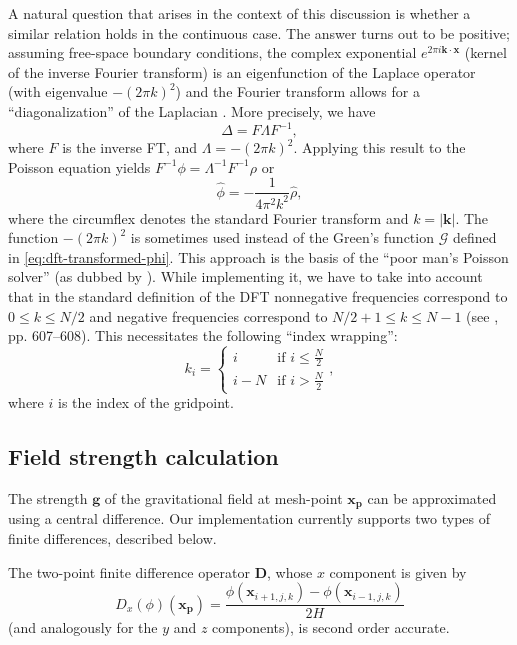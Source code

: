 A natural question that arises in the context of this discussion is whether a similar relation holds in the continuous case.
The answer turns out to be positive;
assuming free-space boundary conditions, the complex exponential $e^{2\pi i \mathbf{k} \cdot \mathbf{x}}$ (kernel of the inverse Fourier transform) is an eigenfunction of the Laplace operator (with eigenvalue $-(2\pi k)^2$) and the Fourier transform allows for a ``diagonalization'' of the Laplacian \cite{demanet2013fourier}.
More precisely, we have
\begin{equation*}
    \Delta = F \Lambda F^{-1},
\end{equation*}
where $F$ is the inverse FT, and $\Lambda = -(2\pi k)^2$.
Applying this result to the Poisson equation yields $F^{-1}\phi = \Lambda^{-1}F^{-1}\rho$ or
\begin{equation}\label{eq:poor-mans-poisson-solver}
    \hat\phi = -\frac{1}{4\pi^2 k^2} \hat\rho,
\end{equation}
where the circumflex denotes the standard Fourier transform and $k = |\mathbf{k}|$.
The function $-(2\pi k)^2$ is sometimes used instead of the Green's function $\mathcal{G}$ defined in \autoref{eq:dft-transformed-phi}.
This approach is the basis of the ``poor man's Poisson solver'' (as dubbed by \cite{Hockney1988}).
While implementing it, we have to take into account that in the standard definition of the DFT nonnegative frequencies correspond to $0 \leq k \leq N/2$ and negative frequencies correspond to $N/2+1 \leq k \leq N-1$ (see \cite{press2007numerical}, pp. 607--608).
This necessitates the following ``index wrapping'':
\begin{equation*}
    k_i =
    \begin{cases}
        i     & \text{if } i \leq \frac{N}{2} \\
        i - N & \text{if } i > \frac{N}{2}
    \end{cases},
\end{equation*}
where $i$ is the index of the gridpoint.

\subsection{Field strength calculation}
The strength $\mathbf{g}$ of the gravitational field at mesh-point $\mathbf{x}_\mathbf{p}$ can be approximated using a central difference.
Our implementation currently supports two types of finite differences, described below.

The two-point finite difference operator $\mathbf{D}$, whose $x$ component is given by
\begin{equation*}
    D_x(\phi)(\mathbf{x_\mathbf{p}}) = \frac{\phi(\mathbf{x}_{i+1,j,k}) - \phi(\mathbf{x}_{i-1,j,k})}{2H}
\end{equation*}
(and analogously for the $y$ and $z$ components), is second order accurate.

